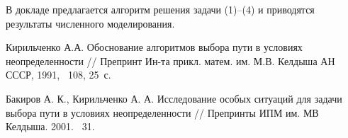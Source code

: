 В докладе предлагается алгоритм решения задачи (1)--(4) и приводятся результаты численного моделирования.


\setcounter{equation}{0}
\setcounter{figure}{0}



\begin{thebibliography}{9} %
 Кирильченко А.А. Обоснование алгоритмов выбора пути в условиях неопределенности  // Препринт Ин-та прикл. матем. им. М.В. Келдыша АН СССР, 1991, \textnumero~108, 25~с.

 Бакиров А. К., Кирильченко А. А. Исследование особых ситуаций для задачи выбора пути в условиях неопределенности // Препринты ИПМ им. МВ Келдыша.  2001.   \textnumero~31.

\end{thebibliography}





%
